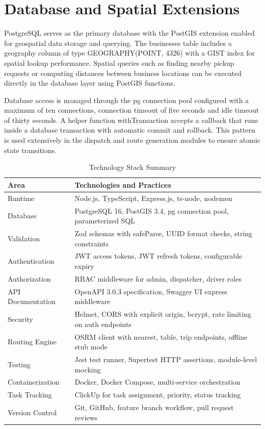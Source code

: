 \documentclass[12pt,a4paper]{report}
\begin{document}
\section{Database and Spatial Extensions}
PostgreSQL serves as the primary database with the PostGIS extension enabled for geospatial data storage and querying. The businesses table includes a geography column of type GEOGRAPHY(POINT, 4326) with a GIST index for spatial lookup performance. Spatial queries such as finding nearby pickup requests or computing distances between business locations can be executed directly in the database layer using PostGIS functions.

Database access is managed through the pg connection pool configured with a maximum of ten connections, connection timeout of five seconds and idle timeout of thirty seconds. A helper function withTransaction accepts a callback that runs inside a database transaction with automatic commit and rollback. This pattern is used extensively in the dispatch and route generation modules to ensure atomic state transitions.

\begin{table}[h!]
\centering
\caption{Technology Stack Summary}
\begin{tabular}{|p{1.4in}|p{4.0in}|}
\hline
\textbf{Area} & \textbf{Technologies and Practices}\\\hline
Runtime & Node.js, TypeScript, Express.js, ts-node, nodemon\\\hline
Database & PostgreSQL 16, PostGIS 3.4, pg connection pool, parameterized SQL\\\hline
Validation & Zod schemas with safeParse, UUID format checks, string constraints\\\hline
Authentication & JWT access tokens, JWT refresh tokens, configurable expiry\\\hline
Authorization & RBAC middleware for admin, dispatcher, driver roles\\\hline
API Documentation & OpenAPI 3.0.3 specification, Swagger UI express middleware\\\hline
Security & Helmet, CORS with explicit origin, bcrypt, rate limiting on auth endpoints\\\hline
Routing Engine & OSRM client with nearest, table, trip endpoints, offline stub mode\\\hline
Testing & Jest test runner, Supertest HTTP assertions, module-level mocking\\\hline
Containerization & Docker, Docker Compose, multi-service orchestration\\\hline
Task Tracking & ClickUp for task assignment, priority, status tracking\\\hline
Version Control & Git, GitHub, feature branch workflow, pull request reviews\\\hline
\end{tabular}
\end{table}
\end{document}

